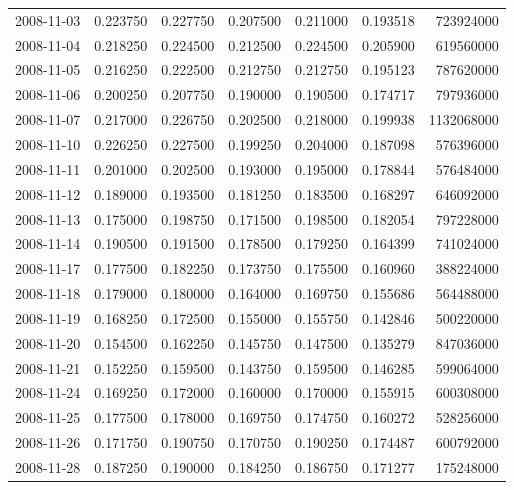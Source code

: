 \begin{tabular}{lrrrrrr}
2008-11-03 &    0.223750 &    0.227750 &    0.207500 &    0.211000 &    0.193518 &   723924000 \\
2008-11-04 &    0.218250 &    0.224500 &    0.212500 &    0.224500 &    0.205900 &   619560000 \\
2008-11-05 &    0.216250 &    0.222500 &    0.212750 &    0.212750 &    0.195123 &   787620000 \\
2008-11-06 &    0.200250 &    0.207750 &    0.190000 &    0.190500 &    0.174717 &   797936000 \\
2008-11-07 &    0.217000 &    0.226750 &    0.202500 &    0.218000 &    0.199938 &  1132068000 \\
2008-11-10 &    0.226250 &    0.227500 &    0.199250 &    0.204000 &    0.187098 &   576396000 \\
2008-11-11 &    0.201000 &    0.202500 &    0.193000 &    0.195000 &    0.178844 &   576484000 \\
2008-11-12 &    0.189000 &    0.193500 &    0.181250 &    0.183500 &    0.168297 &   646092000 \\
2008-11-13 &    0.175000 &    0.198750 &    0.171500 &    0.198500 &    0.182054 &   797228000 \\
2008-11-14 &    0.190500 &    0.191500 &    0.178500 &    0.179250 &    0.164399 &   741024000 \\
2008-11-17 &    0.177500 &    0.182250 &    0.173750 &    0.175500 &    0.160960 &   388224000 \\
2008-11-18 &    0.179000 &    0.180000 &    0.164000 &    0.169750 &    0.155686 &   564488000 \\
2008-11-19 &    0.168250 &    0.172500 &    0.155000 &    0.155750 &    0.142846 &   500220000 \\
2008-11-20 &    0.154500 &    0.162250 &    0.145750 &    0.147500 &    0.135279 &   847036000 \\
2008-11-21 &    0.152250 &    0.159500 &    0.143750 &    0.159500 &    0.146285 &   599064000 \\
2008-11-24 &    0.169250 &    0.172000 &    0.160000 &    0.170000 &    0.155915 &   600308000 \\
2008-11-25 &    0.177500 &    0.178000 &    0.169750 &    0.174750 &    0.160272 &   528256000 \\
2008-11-26 &    0.171750 &    0.190750 &    0.170750 &    0.190250 &    0.174487 &   600792000 \\
2008-11-28 &    0.187250 &    0.190000 &    0.184250 &    0.186750 &    0.171277 &   175248000 \\

\end{tabular}
